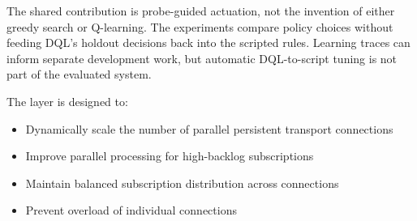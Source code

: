 \documentclass[manuscript]{acmart}
\begin{document}
The shared contribution is probe-guided actuation, not the invention of either
greedy search or Q-learning. The experiments compare policy choices without
feeding DQL's holdout decisions back into the scripted rules. Learning traces
can inform separate development work, but automatic DQL-to-script tuning is
not part of the evaluated system.

The layer is designed to:
   
   \begin{itemize}
   	\item Dynamically scale the number of parallel persistent transport connections
   	\item Improve parallel processing for high-backlog subscriptions
   	\item Maintain balanced subscription distribution across connections
   	\item Prevent overload of individual connections
   \end{itemize}
\end{document}
